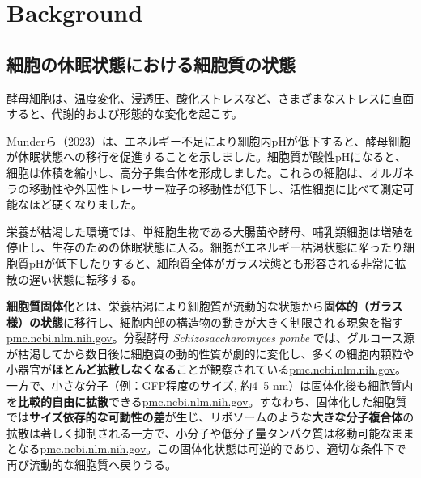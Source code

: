 \chapter{Background}

\section{細胞の休眠状態における細胞質の状態}

酵母細胞は、温度変化、浸透圧、酸化ストレスなど、さまざまなストレスに直面すると、代謝的および形態的な変化を起こす。

Munderら（2023）は、エネルギー不足により細胞内pHが低下すると、酵母細胞が休眠状態への移行を促進することを示しました。細胞質が酸性pHになると、細胞は体積を縮小し、高分子集合体を形成しました。これらの細胞は、オルガネラの移動性や外因性トレーサー粒子の移動性が低下し、活性細胞に比べて測定可能なほど硬くなりました。

栄養が枯渇した環境では、単細胞生物である大腸菌や酵母、哺乳類細胞は増殖を停止し、生存のための休眠状態に入る。細胞がエネルギー枯渇状態に陥ったり細胞質pHが低下したりすると、細胞質全体がガラス状態とも形容される非常に拡散の遅い状態に転移する。

\textbf{細胞質固体化}とは、栄養枯渇により細胞質が流動的な状態から\textbf{固体的（ガラス様）の状態}に移行し、細胞内部の構造物の動きが大きく制限される現象を指す\href{https://pmc.ncbi.nlm.nih.gov/articles/PMC6857596/\#:~:text=run\%20out\%20of\%20nutrients,2016\%20\%3B\%20\%2043}{pmc.ncbi.nlm.nih.gov}。分裂酵母 \textit{Schizosaccharomyces pombe} では、グルコース源が枯渇してから数日後に細胞質の動的性質が劇的に変化し、多くの細胞内顆粒や小器官が\textbf{ほとんど拡散しなくなる}ことが観察されている\href{https://pmc.ncbi.nlm.nih.gov/articles/PMC6857596/\#:~:text=run\%20out\%20of\%20nutrients,2016\%20\%3B\%20\%2043}{pmc.ncbi.nlm.nih.gov}。一方で、小さな分子（例：GFP程度のサイズ, 約4–5 nm）は固体化後も細胞質内を\textbf{比較的自由に拡散}できる\href{https://pmc.ncbi.nlm.nih.gov/articles/PMC6857596/\#:~:text=run\%20out\%20of\%20nutrients,2016\%20\%3B\%20\%2043}{pmc.ncbi.nlm.nih.gov}。すなわち、固体化した細胞質では\textbf{サイズ依存的な可動性の差}が生じ、リボソームのような\textbf{大きな分子複合体}の拡散は著しく抑制される一方で、小分子や低分子量タンパク質は移動可能なままとなる\href{https://pmc.ncbi.nlm.nih.gov/articles/PMC11214080/\#:~:text=spores\%20and\%20uncovered\%20signaling\%20pathways,such\%20as\%20ribosomes\%2C\%20is\%20restricted}{pmc.ncbi.nlm.nih.gov}。この固体化状態は可逆的であり、適切な条件下で再び流動的な細胞質へ戻りうる。

